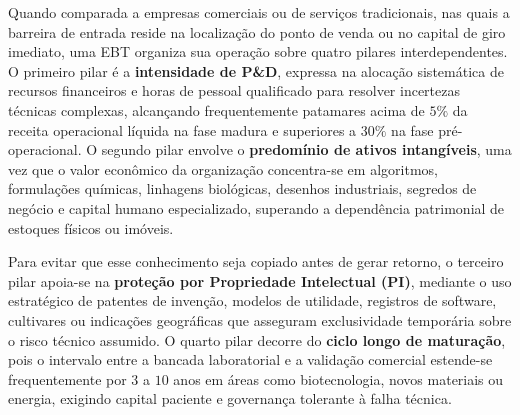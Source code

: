 Quando comparada a empresas comerciais ou de serviços tradicionais, nas quais a barreira de entrada reside na localização do ponto de venda ou no capital de giro imediato, uma EBT organiza sua operação sobre quatro pilares interdependentes. O primeiro pilar é a \textbf{intensidade de P\&D}, expressa na alocação sistemática de recursos financeiros e horas de pessoal qualificado para resolver incertezas técnicas complexas, alcançando frequentemente patamares acima de $5\%$ da receita operacional líquida na fase madura e superiores a $30\%$ na fase pré-operacional. O segundo pilar envolve o \textbf{predomínio de ativos intangíveis}, uma vez que o valor econômico da organização concentra-se em algoritmos, formulações químicas, linhagens biológicas, desenhos industriais, segredos de negócio e capital humano especializado, superando a dependência patrimonial de estoques físicos ou imóveis.

Para evitar que esse conhecimento seja copiado antes de gerar retorno, o terceiro pilar apoia-se na \textbf{proteção por Propriedade Intelectual (PI)}, mediante o uso estratégico de patentes de invenção, modelos de utilidade, registros de software, cultivares ou indicações geográficas que asseguram exclusividade temporária sobre o risco técnico assumido. O quarto pilar decorre do \textbf{ciclo longo de maturação}, pois o intervalo entre a bancada laboratorial e a validação comercial estende-se frequentemente por $3$ a $10$ anos em áreas como biotecnologia, novos materiais ou energia, exigindo capital paciente e governança tolerante à falha técnica.

